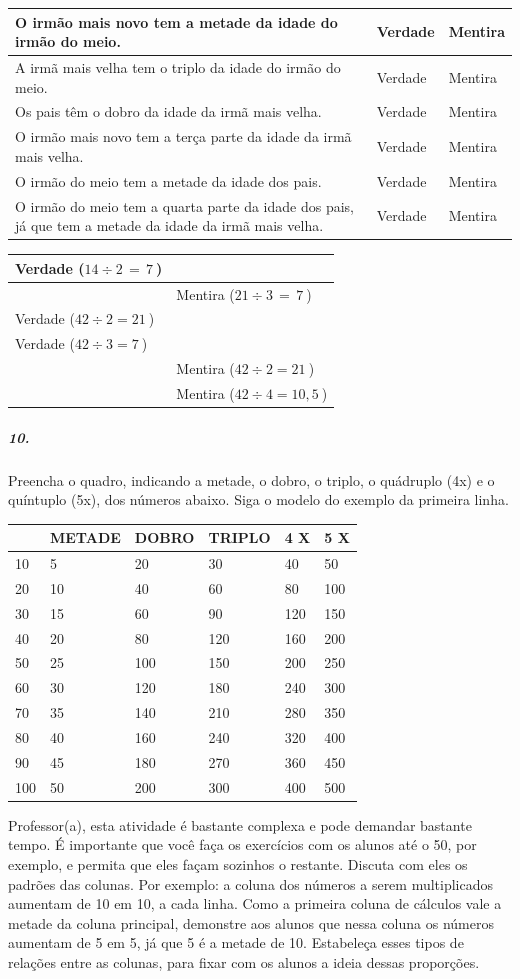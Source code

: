 \begin{longtable}[]{@{}lll@{}}
\toprule
O irmão mais novo tem a metade da idade do irmão do meio. & Verdade &
Mentira\tabularnewline
\midrule
\endhead
A irmã mais velha tem o triplo da idade do irmão do meio. & Verdade &
Mentira\tabularnewline
Os pais têm o dobro da idade da irmã mais velha. & Verdade &
Mentira\tabularnewline
O irmão mais novo tem a terça parte da idade da irmã mais velha. &
Verdade & Mentira\tabularnewline
O irmão do meio tem a metade da idade dos pais. & Verdade &
Mentira\tabularnewline
O irmão do meio tem a quarta parte da idade dos pais, já que tem a
metade da idade da irmã mais velha. & Verdade & Mentira\tabularnewline
\bottomrule
\end{longtable}

\begin{longtable}[]{@{}ll@{}}
\toprule
Verdade (\(14 \div 2\, = \, 7\ \)) &\tabularnewline
\midrule
\endhead
& Mentira (\(21 \div 3\, = \, 7\ \))\tabularnewline
Verdade (\(42 \div 2 = 21\ \)) &\tabularnewline
Verdade (\(42 \div 3 = 7\ \)) &\tabularnewline
& Mentira (\(42 \div 2 = 21\ \))\tabularnewline
& Mentira (\(42 \div 4 = 10,5\ \))\tabularnewline
\bottomrule
\end{longtable}

\subparagraph{10.}\label{section-96}

Preencha o quadro, indicando a metade, o dobro, o triplo, o quádruplo
(4x) e o quíntuplo (5x), dos números abaixo. Siga o modelo do exemplo da
primeira linha.

\begin{longtable}[]{@{}llllll@{}}
\toprule
& METADE & DOBRO & TRIPLO & 4 X & 5 X\tabularnewline
\midrule
\endhead
10 & 5 & 20 & 30 & 40 & 50\tabularnewline
20 & 10 & 40 & 60 & 80 & 100\tabularnewline
30 & 15 & 60 & 90 & 120 & 150\tabularnewline
40 & 20 & 80 & 120 & 160 & 200\tabularnewline
50 & 25 & 100 & 150 & 200 & 250\tabularnewline
60 & 30 & 120 & 180 & 240 & 300\tabularnewline
70 & 35 & 140 & 210 & 280 & 350\tabularnewline
80 & 40 & 160 & 240 & 320 & 400\tabularnewline
90 & 45 & 180 & 270 & 360 & 450\tabularnewline
100 & 50 & 200 & 300 & 400 & 500\tabularnewline
\bottomrule
\end{longtable}

Professor(a), esta atividade é bastante complexa e pode demandar bastante tempo. É importante que você faça os exercícios com os alunos
até o 50, por exemplo, e permita que eles façam sozinhos o restante. Discuta com eles os
padrões das colunas. Por exemplo: a coluna dos números a serem
multiplicados aumentam de 10 em 10, a cada linha. Como a primeira coluna
de cálculos vale a metade da coluna principal, demonstre aos alunos que
nessa coluna os números aumentam de 5 em 5, já que 5 é a metade de 10. Estabeleça
esses tipos de relações entre as colunas, para fixar com os alunos a
ideia dessas proporções.

